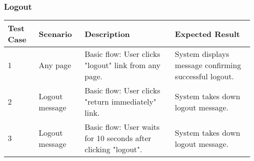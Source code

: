 \subsubsection{Logout}
\begin{table}[!h]
    \begin{tabular}{|l|l|l|l|}
        \hline
        Test Case   & Scenario        & Description                           & Expected Result \\ \hline
        1        & Any page                             & Basic flow: User clicks "logout" link from any page.    & System displays message confirming successful logout.      \\ \hline
        2        & Logout message                  & Basic flow: User clicks "return immediately" link.    & System takes down logout message.         \\ \hline
        3        & Logout message                  & Basic flow: User waits for 10 seconds after clicking "logout".   & System takes down logout message.       \\ \hline
    \end{tabular}
\end{table}

